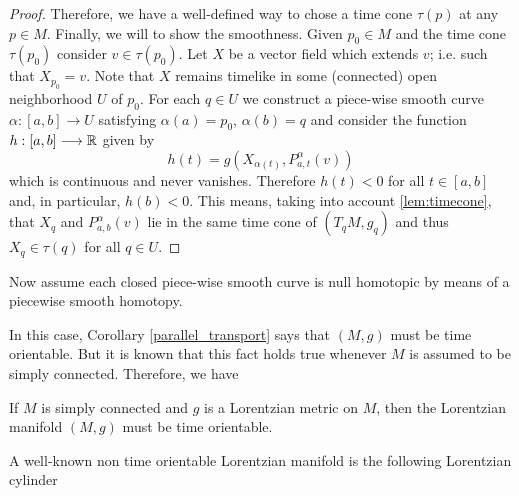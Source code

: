 \begin{proof}
    Therefore, we have a well-defined way to chose a time cone $\tau(p)$ at any $p \in M$. Finally, we will to show the smoothness. Given $p_0 \in M$ and the time cone $\tau(p_0)$ consider $v \in \tau(p_0)$. Let $X$ be a vector field which extends $v$; i.e. such that $X_{p_{0}}=v$. Note that $X$ remains timelike in some (connected) open neighborhood $U$ of $p_0$. For each $q \in U$ we construct a piece-wise smooth curve $\alpha : [a,b] \longrightarrow U$ satisfying $\alpha(a)=p_0$,
    $\alpha(b)=q$ and consider the function $h : [a,b] \longrightarrow \mathbb{R}$ given by
    \[
        h(t)=g(X_{\alpha(t)},P_{a,t}^{\alpha}(v))
    \]
    which is continuous and never vanishes. Therefore $h(t)<0$ for all $t\in [a,b]$ and, in particular, $h(b)<0$. This means, taking into account \autoref{lem:timecone}, that $X_q$ and $P_{a,b}^{\alpha}(v)$ lie in the same time cone of $(T_qM,g_q)$ and thus $X_q \in \tau(q)$ for all $q \in U$.
\end{proof}

Now assume each closed piece-wise smooth curve is null homotopic by means of a piecewise smooth homotopy.

In this case, Corollary \ref{parallel_transport} says that $(M,g)$ must be time orientable. But it is known that this fact holds true whenever $M$ is assumed to be simply connected. Therefore, we have

\begin{corollary}\label{simply_connected}
    If $M$ is simply connected and $g$ is a Lorentzian metric on $M$, then the Lorentzian manifold $(M,g)$ must be time orientable.
\end{corollary}


A well-known non time orientable Lorentzian manifold is the following Lorentzian cylinder \cite[Example 1.2.3]{S-W}


